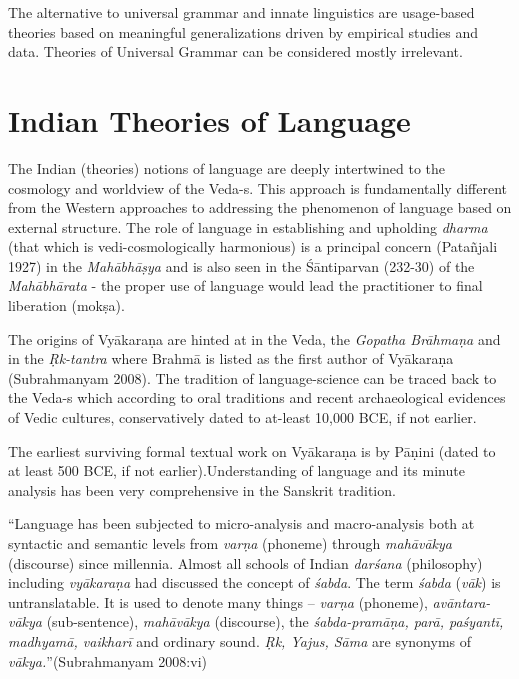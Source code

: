 The alternative to universal grammar and innate linguistics are usage-based theories based on meaningful generalizations driven by empirical studies and data. Theories of Universal Grammar can be considered mostly irrelevant. 

\vskip -26pt


\section*{Indian Theories of Language}

\vskip -6pt

The Indian (theories) notions of language are deeply intertwined to the cosmology and worldview of the Veda-s. This approach is fundamentally different from the Western approaches to addressing the phenomenon of language based on external structure. The role of language in establishing and upholding \textit{dharma} (that which is vedi-cosmologically harmonious) is a principal concern (Patañjali 1927) in the \textit{Mahābhāṣya} and is also seen in the Śāntiparvan (232-30) of the \textit{Mahābhārata} - the proper use of language would lead the practitioner to final liberation (mokṣa).

The origins of Vyākaraṇa are hinted at in the Veda, the \textit{Gopatha Brāhmaṇa} and in the \textit{Ṛk-tantra} where Brahmā is listed as the first author of Vyākaraṇa (Subrahmanyam 2008). The tradition of language-science can be traced back to the Veda-s which according to oral traditions and recent archaeological evidences of Vedic cultures, conservatively dated to at-least 10,000 BCE, if not earlier.

The earliest surviving formal textual work on Vyākaraṇa is by Pāṇini (dated to at least 500 BCE, if not earlier).Understanding of language and its minute analysis has been very comprehensive in the Sanskrit tradition.

\begin{myquote}
“Language has been subjected to micro-analysis and macro-analysis both at syntactic and semantic levels from \textit{varṇa} (phoneme) through \textit{mahāvākya} (discourse) since millennia. Almost all schools of Indian \textit{darśana} (philosophy) including \textit{vyākaraṇa} had discussed the concept of \textit{śabda}. The term \textit{śabda} (\textit{vāk}) is untranslatable. It is used to denote many things – \textit{varṇa} (phoneme), \textit{avāntara-vākya} (sub-sentence), \textit{mahāvākya} (discourse), the \textit{śabda-pramāṇa, parā, paśyantī, madhyamā, vaikharī} and ordinary sound. \textit{Ṛk, Yajus, Sāma} are synonyms of \textit{vākya.}”\hfill (Subrahmanyam 2008:vi)
\end{myquote}

